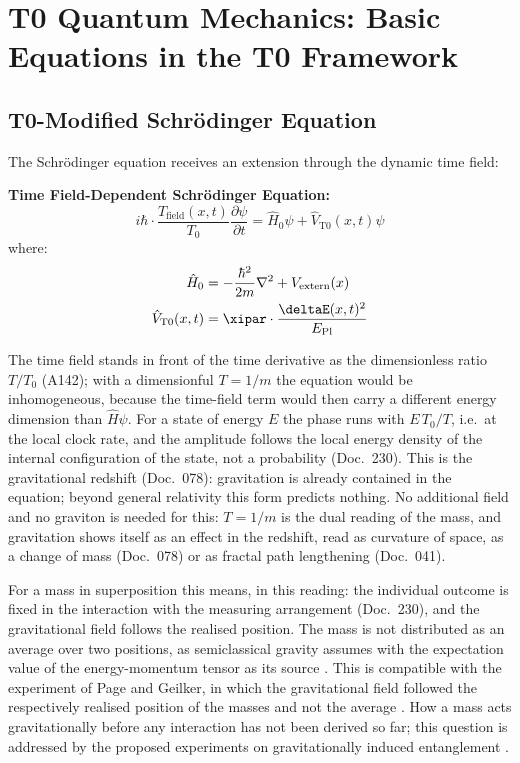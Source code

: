 	\section{T0 Quantum Mechanics: Basic Equations in the T0 Framework}
	\subsection{T0-Modified Schrödinger Equation}
	The Schrödinger equation receives an extension through the dynamic time field:
	\begin{tcolorbox}[colback=cyan!5!white,colframe=cyan!75!black,title={T0 Schrödinger Equation}]
		\textbf{Time Field-Dependent Schrödinger Equation:}
		\begin{equation}
			i\hbar \cdot \frac{T_{\text{field}}(x,t)}{T_0} \frac{\partial\psi}{\partial t} = \hat{H}_0 \psi + \hat{V}_{\text{T0}}(x,t) \psi
		\end{equation}
		where:
		\begin{align}
			\hat{H}_0 &= -\frac{\hbar^2}{2m} \nabla^2 + V_{\text{extern}}(x) \\
			\hat{V}_{\text{T0}}(x,t) &= \xipar \cdot \frac{\deltaE(x,t)^2}{E_{\text{Pl}}}
		\end{align}
	\end{tcolorbox}
	The time field stands in front of the time derivative as the dimensionless ratio $T/T_0$ (A142); with a dimensionful $T=1/m$ the equation would be inhomogeneous, because the time-field term would then carry a different energy dimension than $\hat H\psi$. For a state of energy $E$ the phase runs with $E\,T_0/T$, i.e.\ at the local clock rate, and the amplitude follows the local energy density of the internal configuration of the state, not a probability (Doc.~230). This is the gravitational redshift (Doc.~078): gravitation is already contained in the equation; beyond general relativity this form predicts nothing. No additional field and no graviton is needed for this: $T=1/m$ is the dual reading of the mass, and gravitation shows itself as an effect in the redshift, read as curvature of space, as a change of mass (Doc.~078) or as fractal path lengthening (Doc.~041).

	For a mass in superposition this means, in this reading: the individual outcome is fixed in the interaction with the measuring arrangement (Doc.~230), and the gravitational field follows the realised position. The mass is not distributed as an average over two positions, as semiclassical gravity assumes with the expectation value of the energy-momentum tensor as its source \cite{Moller1962,Rosenfeld1963}. This is compatible with the experiment of Page and Geilker, in which the gravitational field followed the respectively realised position of the masses and not the average \cite{PageGeilker1981}. How a mass acts gravitationally before any interaction has not been derived so far; this question is addressed by the proposed experiments on gravitationally induced entanglement \cite{Bose2017,MarlettoVedral2017}.
